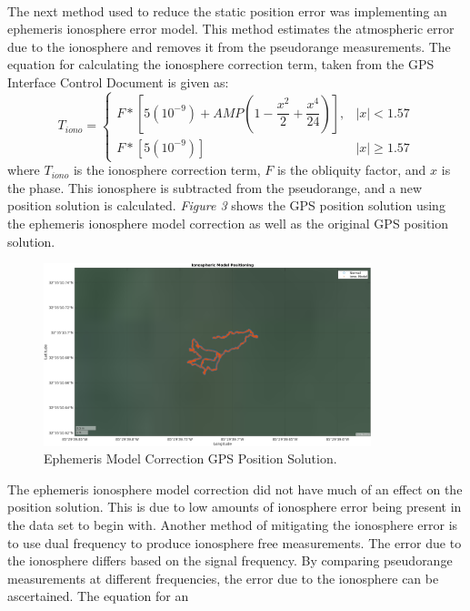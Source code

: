 \documentclass[11pt]{article}
\begin{document}
\begin{enumerate}[label=\textbf{\arabic*.}]
    \\ 
    The next method used to reduce the static position error was implementing an 
    ephemeris ionosphere error model. This method estimates the atmospheric error 
    due to the ionosphere and removes it from the pseudorange measurements. The 
    equation for calculating the ionosphere correction term, taken from the GPS 
    Interface Control Document is given as:
    \begin{equation}
      T_{iono}=
      \begin{cases}
        F*\left[5(10^{-9})+AMP(1-\dfrac{x^2}{2}+\dfrac{x^4}{24})\right], & |x|<1.57 \\
        F*\left[5(10^{-9})\right] & |x|\geq 1.57
      \end{cases}
    \end{equation}
    where $T_{iono}$ is the ionosphere correction term, $F$ is the obliquity 
    factor, and $x$ is the phase. This ionosphere is subtracted from the 
    pseudorange, and a new position solution is calculated. \emph{Figure 3} shows 
    the GPS position solution using the ephemeris ionosphere model correction as 
    well as the original GPS position solution.
    \begin{figure}[H]
      \centering
      \includegraphics[width=0.85\textwidth]{p1_c.png}
      \caption{Ephemeris Model Correction GPS Position Solution.}
    \end{figure}
    The ephemeris ionosphere model correction did not have much of an effect 
    on the position solution. This is due to low amounts of ionosphere error 
    being present in the data set to begin with. Another method of mitigating 
    the ionosphere error is to use dual frequency to produce ionosphere free 
    measurements. The error due to the ionosphere differs based on the signal 
    frequency. By comparing pseudorange measurements at different frequencies, 
    the error due to the ionosphere can be ascertained. The equation for an 

\end{enumerate}
\end{document}
